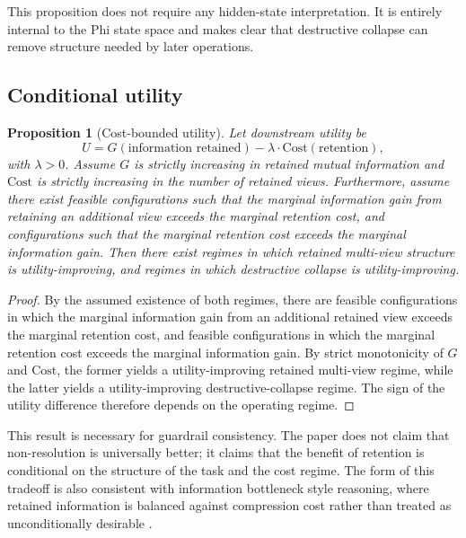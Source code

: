 \documentclass[11pt,a4paper]{article}
\newtheorem{proposition}{Proposition}
\begin{document}
This proposition does not require any hidden-state interpretation. It is entirely internal to the Phi state space and makes clear that destructive collapse can remove structure needed by later operations.

\subsection{Conditional utility}

\begin{proposition}[Cost-bounded utility]
\label{prop:utility}
Let downstream utility be
\begin{equation}
U = G(\text{information retained}) - \lambda \cdot \text{Cost}(\text{retention}),
\end{equation}
with $\lambda > 0$. Assume $G$ is strictly increasing in retained mutual information and $\text{Cost}$ is strictly increasing in the number of retained views. Furthermore, assume there exist feasible configurations such that the marginal information gain from retaining an additional view exceeds the marginal retention cost, and configurations such that the marginal retention cost exceeds the marginal information gain. Then there exist regimes in which retained multi-view structure is utility-improving, and regimes in which destructive collapse is utility-improving.
\end{proposition}

\begin{proof}
By the assumed existence of both regimes, there are feasible configurations in which the marginal information gain from an additional retained view exceeds the marginal retention cost, and feasible configurations in which the marginal retention cost exceeds the marginal information gain. By strict monotonicity of $G$ and $\text{Cost}$, the former yields a utility-improving retained multi-view regime, while the latter yields a utility-improving destructive-collapse regime. The sign of the utility difference therefore depends on the operating regime.
\end{proof}

This result is necessary for guardrail consistency. The paper does not claim that non-resolution is universally better; it claims that the benefit of retention is conditional on the structure of the task and the cost regime. The form of this tradeoff is also consistent with information bottleneck style reasoning, where retained information is balanced against compression cost rather than treated as unconditionally desirable \cite{tishby1999information}.
\end{document}
